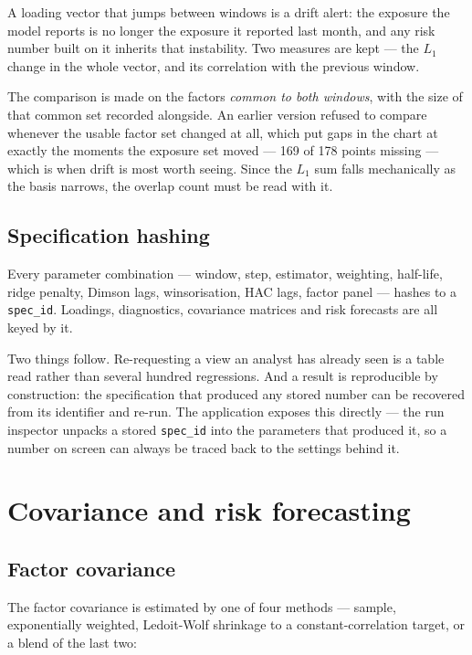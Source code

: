 \documentclass[11pt,a4paper]{article}
\newcommand{\code}[1]{\texttt{\small #1}}
\begin{document}
A loading vector that jumps between windows is a drift alert: the exposure the model
reports is no longer the exposure it reported last month, and any risk number built on
it inherits that instability. Two measures are kept --- the $L_1$ change in the whole
vector, and its correlation with the previous window.

The comparison is made on the factors \emph{common to both windows}, with the size of
that common set recorded alongside. An earlier version refused to compare whenever the
usable factor set changed at all, which put gaps in the chart at exactly the moments
the exposure set moved --- 169 of 178 points missing --- which is when drift is most
worth seeing. Since the $L_1$ sum falls mechanically as the basis narrows, the overlap
count must be read with it.

\subsection{Specification hashing}
\label{sec:spec}

Every parameter combination --- window, step, estimator, weighting, half-life, ridge
penalty, Dimson lags, winsorisation, HAC lags, factor panel --- hashes to a
\code{spec\_id}. Loadings, diagnostics, covariance matrices and risk forecasts are all
keyed by it.

Two things follow. Re-requesting a view an analyst has already seen is a table read
rather than several hundred regressions. And a result is reproducible by
construction: the specification that produced any stored number can be recovered from
its identifier and re-run. The application exposes this directly --- the run inspector
unpacks a stored \code{spec\_id} into the parameters that produced it, so a number on
screen can always be traced back to the settings behind it.

\section{Covariance and risk forecasting}
\label{sec:risk}

\subsection{Factor covariance}

The factor covariance is estimated by one of four methods --- sample, exponentially
weighted, Ledoit-Wolf shrinkage to a constant-correlation target, or a blend of the
last two:
\end{document}
